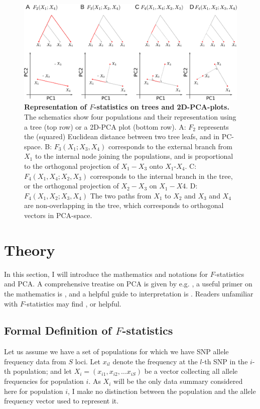 \documentclass[12pt,fullpage, a4paper]{article}
\begin{document}
\begin{figure}[!ht]
	\includegraphics[width=\textwidth]{figures/fstats_pca_vs_tree.pdf}
	\caption{\textbf{Representation of $F$-statistics on trees and 2D-PCA-plots.} The schematics show four populations and their representation using a tree (top row) or a 2D-PCA plot (bottom row). A: $F_2$ represents the (squared) Euclidean distance between two tree leafs, and in PC-space. B: $F_3(X_1; X_3, X_4)$ corresponds to the external branch from $X_1$ to the internal node joining the populations, and is proportional to the orthogonal projection of $X_1 - X_3$ onto $X_1$-$X_4$. C: $F_4(X_1, X_4; X_2, X_3)$ corresponds to the internal branch in the tree, or the orthogonal projection of $X_2 - X_3$ on $X_1 - X4$. D: $F_4(X_1, X_2; X_3, X_4)$ The two paths from $X_1$ to $X_2$ and $X_3$ and $X_4$ are non-overlapping in the tree, which corresponds to orthogonal vectors in PCA-space.}
	\label{fig:geom}
\end{figure}	
	
\section{Theory}
In this section, I will introduce the mathematics and notations for $F$-statistics and PCA. A comprehensive  treatise on PCA is given by e.g. \cite{jolliffe2013}, a useful primer on the mathematics is \cite{pachter2014}, and a helpful guide to interpretation is \cite{cavalli-sforza1994}. Readers unfamiliar with $F$-statistics may find \cite{patterson2012}, \cite{peter2016} or \cite{oteo-garcia2021} helpful.

\subsection{Formal Definition of $F$-statistics}
Let us assume we have a set of populations for which we have SNP allele frequency data from $S$ loci. Let $x_{il}$ denote the frequency at the $l$-th SNP in the $i$-th population; and let $X_i = (x_{i1}, x_{i2}, \dots x_{iS})$  be a vector collecting all allele frequencies for population $i$. As $X_i$ will be the only data summary considered here for population $i$, I make no distinction between the population and the allele frequency vector used to represent it.
\end{document}
